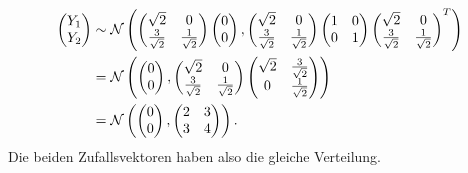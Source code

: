 \documentclass[a4paper]{article}
\begin{document}
\begin{align*}
    \left(\begin{matrix}Y_1 \\ Y_2\end{matrix}\right) &\sim \mathcal{N} \left( \left(\begin{matrix}\sqrt{2} & 0 \\ \frac{3}{\sqrt{2}} & \frac{1}{\sqrt{2}}\end{matrix}\right) \left(\begin{matrix}0 \\ 0\end{matrix}\right), \left(\begin{matrix}\sqrt{2} & 0 \\ \frac{3}{\sqrt{2}} & \frac{1}{\sqrt{2}}\end{matrix}\right) \left(\begin{matrix}1 & 0 \\ 0 & 1\end{matrix}\right) \left(\begin{matrix}\sqrt{2} & 0 \\ \frac{3}{\sqrt{2}} & \frac{1}{\sqrt{2}}\end{matrix}\right)^T \right)\\
    &= \mathcal{N} \left( \left(\begin{matrix}0 \\ 0\end{matrix}\right), \left(\begin{matrix}\sqrt{2} & 0 \\ \frac{3}{\sqrt{2}} & \frac{1}{\sqrt{2}}\end{matrix}\right) \left(\begin{matrix}\sqrt{2} & \frac{3}{\sqrt{2}} \\ 0 & \frac{1}{\sqrt{2}}\end{matrix}\right)   \right)\\
    &= \mathcal{N}\left( \left(\begin{matrix}0 \\ 0\end{matrix}\right), \left(\begin{matrix}2 &  3 \\ 3 & 4\end{matrix}\right) \right)
    \text{.}
\end{align*}
Die beiden Zufallsvektoren haben also die gleiche Verteilung.
\end{document}
